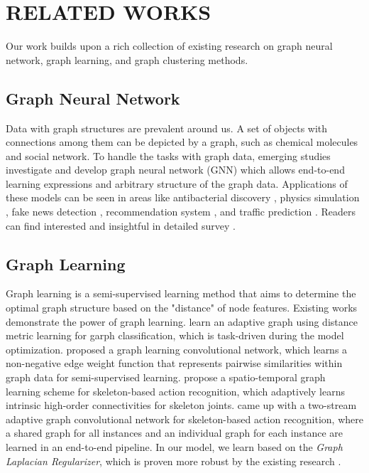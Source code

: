 \chapter{RELATED WORKS}
\pagestyle{fancy}

Our work builds upon a rich collection of existing research on graph neural network, graph learning, and graph clustering methods.

\section{Graph Neural Network}

Data with graph structures are prevalent around us. A set of objects with connections among them can be depicted by a graph, such as chemical molecules and social network. To handle the tasks with graph data, emerging studies investigate and develop graph neural network (GNN) which allows end-to-end learning expressions and arbitrary structure of the graph data. Applications of these models can be seen in areas like antibacterial discovery \citep{stokes2020deep}, physics simulation \citep{sanchez2020learning}, fake news detection \citep{monti2019fake}, recommendation system \citep{eksombatchai2018pixie}, and traffic prediction \citep{lange2020traffic}. Readers can find interested and insightful in detailed survey \citep{sanchez2021gentle}.

\section{Graph Learning}

Graph learning is a semi-supervised learning method that aims to determine the optimal graph structure based on the "distance" of node features. Existing works demonstrate the power of graph learning. \citet{https://doi.org/10.48550/arxiv.1801.03226} learn an adaptive graph using distance metric learning for garph classification, which is task-driven during the model optimization. \citet{zhu2005semi} proposed a graph learning convolutional network, which learns a non-negative edge weight function that represents pairwise similarities within graph data for semi-supervised learning. \citet{li2019spatio} propose a spatio-temporal graph learning scheme for skeleton-based action recognition, which adaptively learns intrinsic high-order connectivities for skeleton joints. \citet{shi2019two} came up with a two-stream adaptive graph convolutional network for skeleton-based action recognition, where a shared graph for all instances and an individual graph for each instance are learned in an end-to-end pipeline. In our model, we learn based on the \emph{Graph Laplacian Regularizer}, which is proven more robust by the existing research \citep{shuman2013emerging}.


